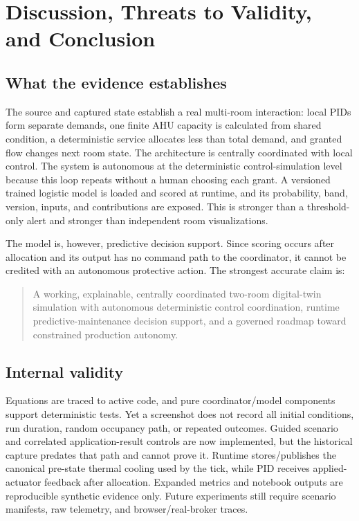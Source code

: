 \chapter{Discussion, Threats to Validity, and Conclusion}
\label{ch:conclusion}

\section{What the evidence establishes}
The source and captured state establish a real multi-room interaction: local PIDs form separate demands, one finite AHU capacity is calculated from shared condition, a deterministic service allocates less than total demand, and granted flow changes next room state. The architecture is centrally coordinated with local control. The system is autonomous at the deterministic control-simulation level because this loop repeats without a human choosing each grant. A versioned trained logistic model is loaded and scored at runtime, and its probability, band, version, inputs, and contributions are exposed. This is stronger than a threshold-only alert and stronger than independent room visualizations.

The model is, however, predictive decision support. Since scoring occurs after allocation and its output has no command path to the coordinator, it cannot be credited with an autonomous protective action. The strongest accurate claim is:
\begin{quote}
A working, explainable, centrally coordinated two-room digital-twin simulation with autonomous deterministic control coordination, runtime predictive-maintenance decision support, and a governed roadmap toward constrained production autonomy.
\end{quote}

\section{Internal validity}
Equations are traced to active code, and pure coordinator/model components support deterministic tests. Yet a screenshot does not record all initial conditions, run duration, random occupancy path, or repeated outcomes. Guided scenario and correlated application-result controls are now implemented, but the historical capture predates that path and cannot prove it. Runtime stores/publishes the canonical pre-state thermal cooling used by the tick, while PID receives applied-actuator feedback after allocation. Expanded metrics and notebook outputs are reproducible synthetic evidence only. Future experiments still require scenario manifests, raw telemetry, and browser/real-broker traces.


